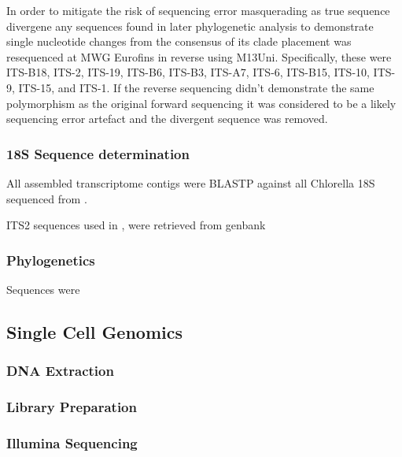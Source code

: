In order to mitigate the risk of sequencing error masquerading
as true sequence divergene any sequences found in later phylogenetic
analysis to demonstrate single nucleotide changes from the consensus
of its clade placement was resequenced at MWG Eurofins in reverse 
using M13Uni.  Specifically, these were ITS-B18,
ITS-2, ITS-19, ITS-B6, ITS-B3, ITS-A7, ITS-6, ITS-B15,
ITS-10, ITS-9, ITS-15, and ITS-1.
If the reverse sequencing didn't demonstrate the same polymorphism as
the original forward sequencing it was considered to be a likely 
sequencing error artefact and the divergent sequence was removed. 


\subsubsection{18S Sequence determination}

All assembled transcriptome contigs were BLASTP 
against all Chlorella 18S sequenced from 
\citep{Imamura2008}.



ITS2 sequences used in \citep{Hoshina2010}, \citep{Hoshina2013} were retrieved
from genbank



\subsubsection{Phylogenetics}

Sequences were 





\subsection{Single Cell Genomics}

\subsubsection{DNA Extraction}

\subsubsection{Library Preparation}

\subsubsection{Illumina Sequencing}

